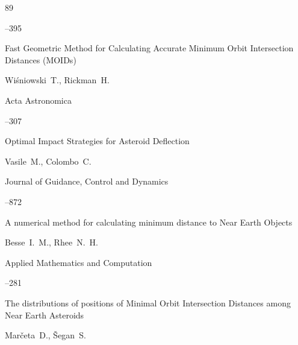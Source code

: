 \begin{thebibliography}{89}


--395






\paper Fast Geometric Method for Calculating Accurate Minimum Orbit Intersection Distances (MOIDs)

\by Wi\'sniowski~T., Rickman~H. 

\jour Acta Astronomica 




--307 





\paper Optimal Impact Strategies for Asteroid Deflection

\by Vasile~M., Colombo~C. 

\jour Journal of Guidance, Control and Dynamics




--872






\paper A numerical method for calculating minimum distance to Near Earth Objects

\by Besse~I.~M., Rhee~N.~H.

\jour Applied Mathematics and Computation



–281






\paper The distributions of positions of Minimal Orbit Intersection Distances among Near Earth Asteroids 

\by Mar\v{c}eta~D., \v{S}egan~S. 


\end{thebibliography}
